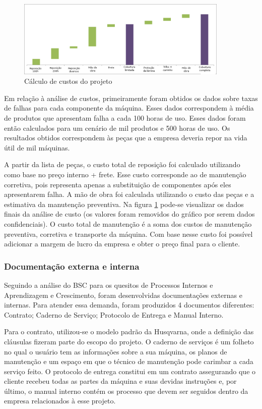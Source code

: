 \documentclass[12pt]{article}
\begin{document}
\begin{figure}[h!]
	\centering
	\includegraphics[width=0.9\textwidth]{img/ws220-waterfall-pt.png}
	\caption{Cálculo de custos do projeto}
	\label{fig:ws-waterfall}
\end{figure}

	Em relação à análise de custos, primeiramente foram obtidos os dados sobre taxas de falhas para cada componente da máquina. Esses dados correspondem à média de produtos que apresentam falha a cada 100 horas de uso. Esses dados foram então calculados para um cenário de mil produtos e 500 horas de uso. Os resultados obtidos correspondem às peças que a empresa deveria repor na vida útil de mil máquinas. 
	
	A partir da lista de peças, o custo total de reposição foi calculado utilizando como base no preço interno + frete. Esse custo corresponde ao de manutenção corretiva, pois representa apenas a substituição de componentes após eles apresentarem falha. A mão de obra foi calculada utilizando o custo das peças e a estimativa da manutenção preventiva. Na figura \ref{fig:ws-waterfall} pode-se visualizar os dados finais da análise de custo (os valores foram removidos do gráfico por serem dados confidenciais). O custo total de manutenção é a soma dos custos de manutenção preventiva, corretiva e transporte da máquina. Com base nesse custo foi possível adicionar a margem de lucro da empresa e obter o preço final para o cliente.
	
\subsubsection{Documentação externa e interna}

	Seguindo a análise do BSC para os quesitos de Processos Internos e Aprendizagem e Crescimento, foram desenvolvidas documentações externas e internas. Para atender essa demanda, foram produzidos 4 documentos diferentes: Contrato; Caderno de Serviço; Protocolo de Entrega e Manual Interno.

	Para o contrato, utilizou-se o modelo padrão da Husqvarna, onde a definição das cláusulas fizeram parte do escopo do projeto. O caderno de serviços é um folheto no qual o usuário tem as informações sobre a sua máquina, os planos de manutenção e um espaço em que o técnico de manutenção pode carimbar a cada serviço feito. O protocolo de entrega constitui em um contrato assegurando que o cliente recebeu todas as partes da máquina e suas devidas instruções e, por último, o manual interno contém os processo que devem ser seguidos dentro da empresa relacionados à esse projeto.
\end{document}
